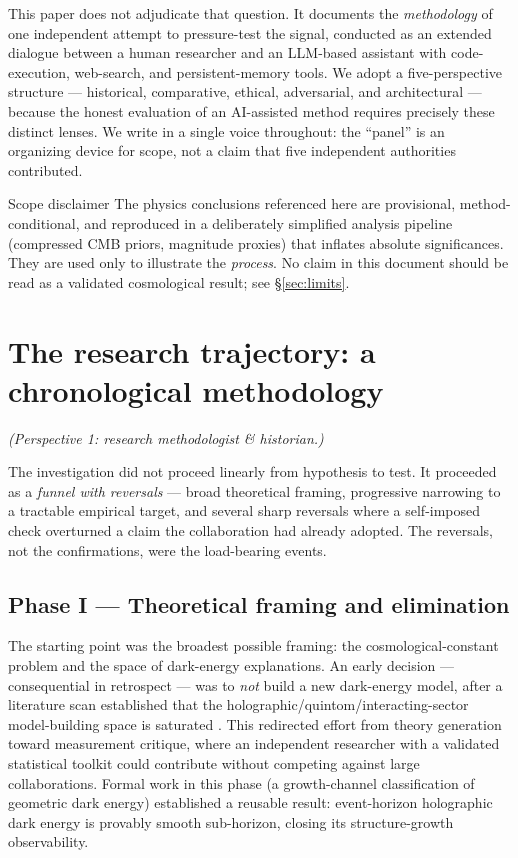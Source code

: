 \documentclass[11pt]{article}
\begin{document}
This paper does not adjudicate that question. It documents the \emph{methodology} of one independent attempt to pressure-test the signal, conducted as an extended dialogue between a human researcher and an LLM-based assistant with code-execution, web-search, and persistent-memory tools. We adopt a five-perspective structure --- historical, comparative, ethical, adversarial, and architectural --- because the honest evaluation of an AI-assisted method requires precisely these distinct lenses. We write in a single voice throughout: the ``panel'' is an organizing device for scope, not a claim that five independent authorities contributed.

\begin{keybox}{Scope disclaimer}
The physics conclusions referenced here are provisional, method-conditional, and reproduced in a deliberately simplified analysis pipeline (compressed CMB priors, magnitude proxies) that inflates absolute significances. They are used only to illustrate the \emph{process}. No claim in this document should be read as a validated cosmological result; see \S\ref{sec:limits}.
\end{keybox}

\section{The research trajectory: a chronological methodology}
\label{sec:history}
\emph{(Perspective 1: research methodologist \& historian.)}

The investigation did not proceed linearly from hypothesis to test. It proceeded as a \emph{funnel with reversals} --- broad theoretical framing, progressive narrowing to a tractable empirical target, and several sharp reversals where a self-imposed check overturned a claim the collaboration had already adopted. The reversals, not the confirmations, were the load-bearing events.

\subsection{Phase I --- Theoretical framing and elimination}
The starting point was the broadest possible framing: the cosmological-constant problem and the space of dark-energy explanations. An early decision --- consequential in retrospect --- was to \emph{not} build a new dark-energy model, after a literature scan established that the holographic/quintom/interacting-sector model-building space is saturated \citep{quintom}. This redirected effort from theory generation toward measurement critique, where an independent researcher with a validated statistical toolkit could contribute without competing against large collaborations. Formal work in this phase (a growth-channel classification of geometric dark energy) established a reusable result: event-horizon holographic dark energy is provably smooth sub-horizon, closing its structure-growth observability.
\end{document}
